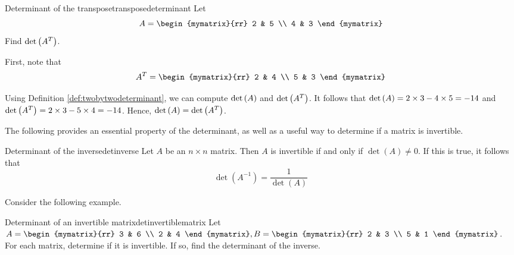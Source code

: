 \begin{example}{Determinant of the transpose}{transposedeterminant}
Let
\begin{equation*}
A
=
\begin{mymatrix}{rr}
2 & 5 \\
4 & 3
\end{mymatrix}
\end{equation*}
Find $\det \left(A^T\right)$.
\end{example}

\begin{solution}
First, note that 
\begin{equation*}
A^{T}
=
\begin{mymatrix}{rr}
2 & 4 \\
5 & 3
\end{mymatrix}
\end{equation*}

Using Definition \ref{def:twobytwodeterminant}, we can compute $\det \left(A\right)$ and $\det \left(A^T\right)$. It follows that
$\det \left(A\right) = 2 \times 3 - 4 \times 5 = -14$ and $\det \left(A^T\right) = 2 \times 3 - 5 \times 4 = -14$. 
Hence, $\det \left(A\right) = \det \left(A^T\right)$.
\end{solution}

The following provides an essential property of the determinant, as well as a useful way to determine if a matrix is invertible.

\begin{theorem}{Determinant of the inverse}{detinverse}
Let $A$ be an $n \times n$ matrix. Then $A$ is invertible if and only if $\det(A) \neq 0$. If this is true, it follows that 
\[
\det(A^{-1}) = \frac{1}{\det(A)}
\]
\end{theorem}

Consider the following example.

\begin{example}{Determinant of an invertible matrix}{detinvertiblematrix}
Let $A = \begin{mymatrix}{rr}
3 & 6 \\
2 & 4 
\end{mymatrix}, B = \begin{mymatrix}{rr}
2 & 3 \\
5 & 1
\end{mymatrix}$. For each matrix, determine if it is invertible. If so, find the determinant of the inverse. 
\end{example}


